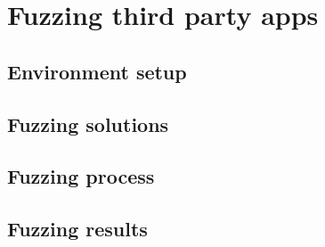 \section{Fuzzing third party apps} \label{sec:fuzzing}
\subsection{Environment setup}

\subsection{Fuzzing solutions}
\subsection{Fuzzing process}
\subsection{Fuzzing results}